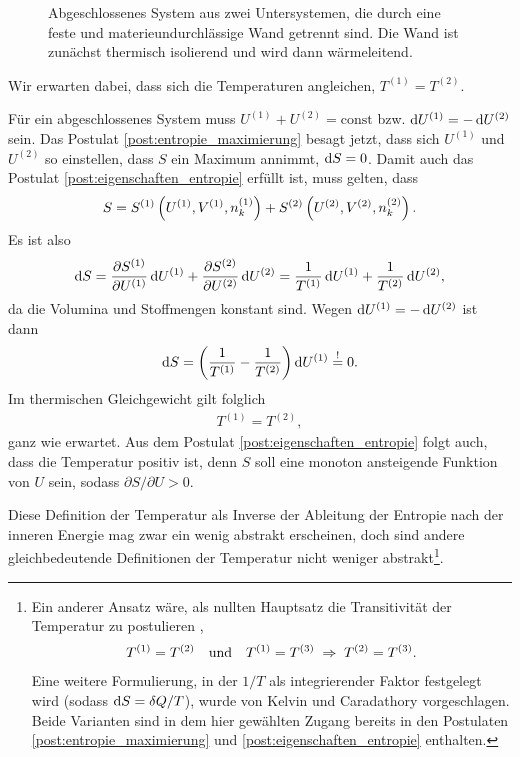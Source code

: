 \begin{figure}[htbp]
    \centering
    \tfigDoppelsystemUSfesteWaermeleitendeWand
    \caption{Abgeschlossenes System aus zwei Untersystemen, die durch eine feste und materieundurchlässige Wand getrennt sind. Die Wand ist zunächst thermisch isolierend und wird dann wärmeleitend.}
    \label{fig:DoppelsystemUSfesteWaermeleitendeWand}
\end{figure}

Wir erwarten dabei, dass sich die Temperaturen angleichen, $T^{(1)}=T^{(2)}$.

Für ein abgeschlossenes System muss $U^{(1)}+U^{(2)} = \mathrm{const}$ bzw. $\mathop{}\!\mathrm{d} U^{(1)} = -\mathop{}\!\mathrm{d} U^{(2)}$ sein. Das Postulat \ref{post:entropie_maximierung} besagt jetzt, dass sich $U^{(1)}$ und $U^{(2)}$ so einstellen, dass $S$ ein Maximum annimmt, $\mathop{}\!\mathrm{d} S=0$. Damit auch das Postulat \ref{post:eigenschaften_entropie} erfüllt ist, muss gelten, dass
\begin{align*}
    S=S^{(1)}\left(U^{(1)},V^{(1)},n^{(1)}_k\right) + S^{(2)}\left(U^{(2)},V^{(2)},n^{(2)}_k\right).
\end{align*}
Es ist also
\begin{align*}
    \mathop{}\!\mathrm{d} S = \frac{\partial S^{(1)}}{\partial U^{(1)}}\mathop{}\!\mathrm{d} U^{(1)}+ \frac{\partial S^{(2)}}{\partial U^{(2)}}\mathop{}\!\mathrm{d} U^{(2)} = \frac{1}{T^{(1)}}\mathop{}\!\mathrm{d} U^{(1)} + \frac{1}{T^{(2)}}\mathop{}\!\mathrm{d} U^{(2)},
\end{align*}
da die Volumina und Stoffmengen konstant sind. Wegen $\mathop{}\!\mathrm{d} U^{(1)} = -\mathop{}\!\mathrm{d} U^{(2)}$ ist dann
\begin{align*}
    \mathop{}\!\mathrm{d} S = \left(\frac{1}{T^{(1)}}-\frac{1}{T^{(2)}}\right)\mathop{}\!\mathrm{d} U^{(1)} \overset{!}{=} 0.
\end{align*}
Im thermischen Gleichgewicht gilt folglich
\begin{align}
    \label{eq:thermisches_gg_temperatur}
    T^{(1)} = T^{(2)},
\end{align}
ganz wie erwartet. Aus dem Postulat \ref{post:eigenschaften_entropie} folgt auch, dass die Temperatur positiv ist, denn $S$ soll eine monoton ansteigende Funktion von $U$ sein, sodass $\partial S/\partial U > 0$.

Diese Definition der Temperatur als Inverse der Ableitung der Entropie nach der inneren Energie mag zwar ein wenig abstrakt erscheinen, doch sind andere gleichbedeutende Definitionen der Temperatur nicht weniger abstrakt\footnote{Ein anderer Ansatz wäre, als nullten Hauptsatz die Transitivität der Temperatur zu postulieren \cite{lit:nolting1},
    \begin{align*}
        T^{(1)} = T^{(2)} \quad \text{und}\quad T^{(1)} = T^{(3)} \;\Rightarrow\; T^{(2)} = T^{(3)}.
    \end{align*}
    Eine weitere Formulierung, in der $1/T$ als integrierender Faktor festgelegt wird (sodass $\mathop{}\!\mathrm{d} S=\mathop{}\!\delta Q/T$), wurde von Kelvin und Caradathory vorgeschlagen.
    Beide Varianten sind in dem hier gewählten Zugang bereits in den Postulaten \ref{post:entropie_maximierung} und \ref{post:eigenschaften_entropie} enthalten.
}.

